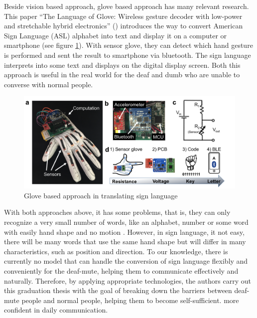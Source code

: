   Beside vision based approach, glove based approach has many relevant research. This paper “The Language of Glove: Wireless gesture
  decoder with low-power and stretchable hybrid electronics” (\cite{o2017language}) introduces the way to convert American
  Sign Language (ASL) alphabet into text and display it on a computer 
  or smartphone (see figure \ref{fig:Chap2-Glove-Base}). With sensor glove, they can detect which hand gesture is
  performed and sent the result to smartphone via bluetooth. The sign language
  interprets into some text and displays on the digital display screen.
  Both this approach is useful in the real world for the deaf and dumb 
  who are unable to converse with normal people.

  \begin{figure}[H]
    \centering
    \includegraphics[width=\textwidth]{img/Chap2/Glove-Based.png}
    \caption{Glove based approach in translating sign language}
    \label{fig:Chap2-Glove-Base}
  \end{figure}

  With both approaches above, it has some problems, that is, they can only recognize 
  a very small number of words, like an alphabet, number or some word with easily hand shape and no motion .
  However, in sign language, it not easy, there will be many words 
  that use the same hand shape but will differ in many characteristics, such as position 
  and direction. To our knowledge, there is currently no model that can handle the 
  conversion of sign language flexibly and conveniently for the deaf-mute, helping them 
  to communicate effectively and naturally. Therefore, by applying appropriate 
  technologies, the authors carry out this graduation thesis with the goal of breaking down 
  the barriers between deaf-mute people and normal people, helping them to become self-sufficient. 
  more confident in daily communication.


